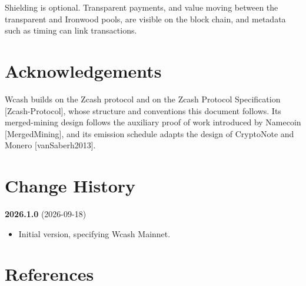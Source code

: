 \documentclass[10pt,letterpaper]{article}
\theoremstyle{plain}
\begin{document}
Shielding is optional. Transparent payments, and value moving between the transparent and Ironwood pools, are visible on the block chain, and metadata such as timing can link transactions.

\section{Acknowledgements}\label{sec:ack}

Wcash builds on the Zcash protocol and on the Zcash Protocol Specification [Zcash-Protocol], whose structure and conventions this document follows. Its merged-mining design follows the auxiliary proof of work introduced by Namecoin [MergedMining], and its emission schedule adapts the design of CryptoNote and Monero [vanSaberh2013].

\section{Change History}\label{sec:changes}

\textbf{2026.1.0} (2026-09-18)
\begin{itemize}
\item Initial version, specifying Wcash Mainnet.
\end{itemize}

\section{References}\label{sec:refs}
\end{document}
